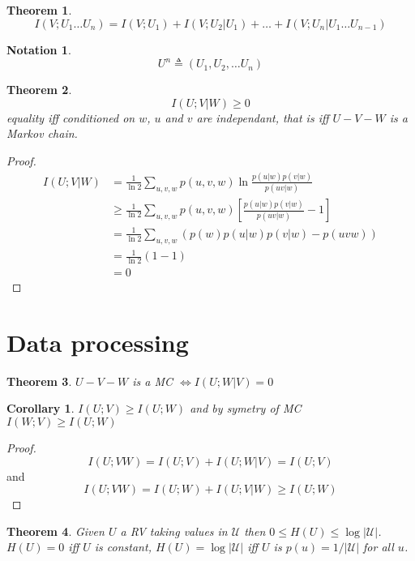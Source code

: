 \documentclass{article}
\newtheorem{theorem}{Theorem}[section]
\newtheorem{corollary}{Corollary}[theorem]
\newtheorem{notation}{Notation}
\def\U{\mathcal{U}}
\begin{document}
\begin{theorem}
  \[
    I(V;U_1\dots U_n) = I(V;U_1) + I(V;U_2 | U_1) + \dots + I(V;U_n|U_1 \dots U_{n-1})
  \]
\end{theorem}

\begin{notation}
  \[
    U^n \triangleq (U_1, U_2, \dots U_n)
  \]
\end{notation}

\begin{theorem}
  \[
    I(U;V |W) \geq 0
  \]
  equality iff conditioned on $w$, $u$ and $v$ are independant, that is iff $U-V-W$ is a Markov chain.
\end{theorem}

\begin{proof}
  \begin{align*}
    I(U;V|W) &= \frac 1 {\ln 2} \sum_{u,v,w} p(u,v,w) \ln \frac {p(u|w)p(v|w)} {p(uv | w)}\\
    &\geq \frac 1 {\ln 2} \sum_{u,v,w} p(u,v,w) \left[ \frac {p(u|w)p(v|w)} {p(uv | w)} - 1 \right]\\
    &=\frac 1 {\ln 2} \sum_{u,v,w}(p(w)p(u|w)p(v|w) - p(uvw))\\
    &= \frac 1 {\ln 2}(1 - 1) \\
    &=0
  \end{align*}
\end{proof}


\section{Data processing}

\begin{theorem}
  $U-V-W$ is a MC $\iff I(U;W|V) = 0$
\end{theorem}

\begin{corollary}
  $I(U;V) \geq I(U;W)$ and by symetry of MC $I(W;V) \geq I(U;W)$
\end{corollary}

\begin{proof}
  \[
    I(U;VW) = I(U;V) + I(U;W|V) = I(U;V)
  \]
  and
  \[
    I(U;VW) = I(U;W) + I(U;V|W) \geq I(U;W)
  \]
\end{proof}

\begin{theorem}
  Given $U$ a RV taking values in $\U$ then $0 \leq H(U) \leq \log | \U |$. $H(U)=0$ iff $U$ is constant, $H(U)=\log | \U |$ iff $U$ is $p(u) = 1 / |\U|$ for all $u$.
\end{theorem}
\end{document}
